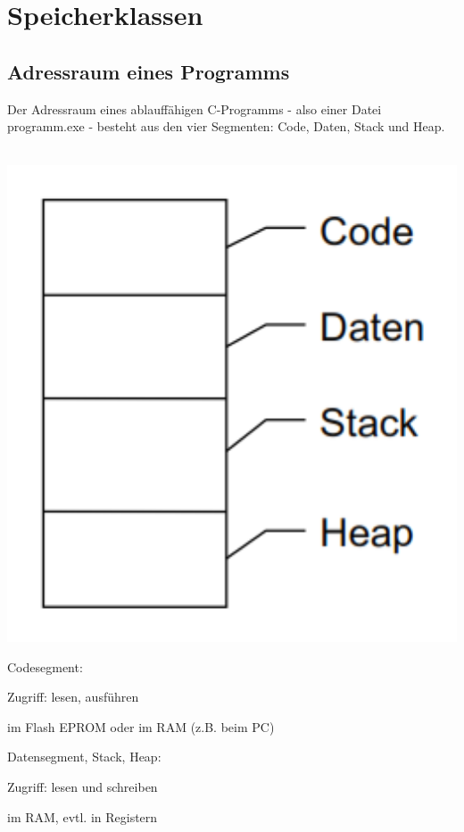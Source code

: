 \section{Speicherklassen}
	\subsection{Adressraum eines Programms}
		\begin{minipage}[t]{10 cm}
			Der Adressraum eines ablauffähigen C-Programms - also einer Datei programm.exe - besteht aus den vier Segmenten: Code, Daten, Stack und Heap.\\\\
			\begin{minipage}[c]{4 cm}
				\includegraphics[width=1\textwidth]{pics/Adressraum.png}
			\end{minipage}
			\hspace*{0.5cm}
			\begin{minipage}[c]{5 cm}
				Codesegment:
				\begin{compactitem}
					\item Zugriff: lesen, ausführen
					\item im Flash EPROM oder im RAM (z.B. beim PC)
				\end{compactitem}
				\vspace*{0.5cm}
				Datensegment, Stack, Heap:
				\begin{compactitem}
					\item Zugriff: lesen und schreiben
					\item im RAM, evtl. in Registern
				\end{compactitem}				
			\end{minipage}
		\end{minipage}
